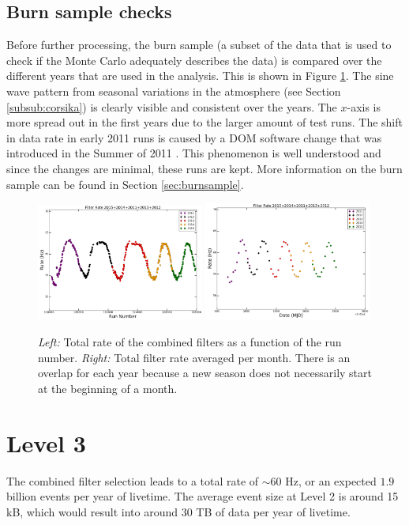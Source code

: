 \subsection{Burn sample checks}
Before further processing, the burn sample (a subset of the data that is used to check if the Monte Carlo adequately describes the data) is compared over the different years that are used in the analysis. This is shown in Figure \ref{fig:burnsamplechecks}. The sine wave pattern from seasonal variations in the atmosphere (see Section \ref{subsub:corsika}) is clearly visible and consistent over the years. The $x$-axis is more spread out in the first years due to the larger amount of test runs. The shift in data rate in early 2011 runs is caused by a DOM software change that was introduced in the Summer of 2011 \cite{2011rate}. This phenomenon is well understood and since the changes are minimal, these runs are kept.
More information on the burn sample can be found in Section \ref{sec:burnsample}.

\begin{figure}[t]
\centering
\includegraphics[width=0.49\textwidth]{chapter8/img/FilterRatePerRun.png}
\includegraphics[width=0.49\textwidth]{chapter8/img/FilterRatePerMonth.png}
\caption{\textit{Left: }Total rate of the combined filters as a function of the run number. \textit{Right: }Total filter rate averaged per month. There is an overlap for each year because a new season does not necessarily start at the beginning of a month.}
\label{fig:burnsamplechecks}
\end{figure}

\section{Level 3}
The combined filter selection leads to a total rate of $\sim$60 Hz, or an expected $1.9$ billion events per year of livetime. The average event size at Level 2 is around 15 kB, which would result into around 30 TB of data per year of livetime.

